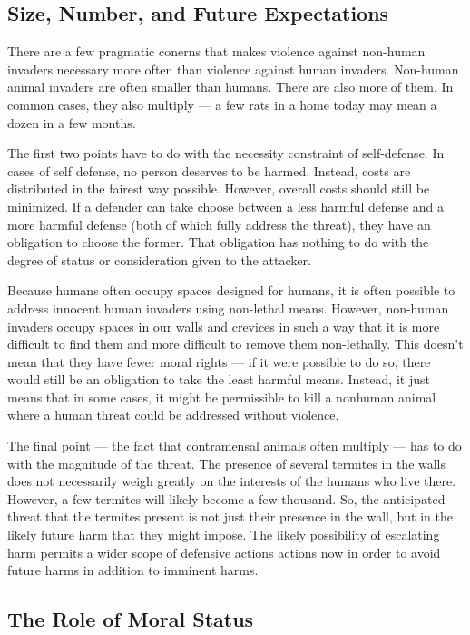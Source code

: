 	\subsection{Size, Number, and Future Expectations}

	There are a few pragmatic conerns that makes violence against non-human
	invaders necessary more often than violence against human invaders.
	Non-human animal invaders are often smaller than humans. There are also more
	of them. In common cases, they also multiply --- a few rats in a home today
	may mean a dozen in a few months.

	The first two points have to do with the necessity constraint of
	self-defense.  In cases of self defense, no person deserves to be harmed.
	Instead, costs are distributed in the fairest way possible. However,
	overall costs should still be minimized. If a defender can take choose
	between a less harmful defense and a more harmful defense (both of which
	fully address the threat), they have an obligation to choose the former.
	That obligation has nothing to do with the degree of status or
	consideration given to the attacker.

	Because humans often occupy spaces designed for humans, it is often
	possible to address innocent human invaders using non-lethal means.
	However, non-human invaders occupy spaces in our walls and crevices in such
	a way that it is more difficult to find them and more difficult to remove
	them non-lethally. This doesn’t mean that they have fewer moral rights ---
	if it were possible to do so, there would still be an obligation to take
	the least harmful means. Instead, it just means that in some cases, it
	might be permissible to kill a nonhuman animal where a human threat could
	be addressed without violence.

	The final point --- the fact that contramensal animals often multiply ---
	has to do with the magnitude of the threat. The presence of several
	termites in the walls does not necessarily weigh greatly on the interests
	of the humans who live there. However, a few termites will likely become a
	few thousand. So, the anticipated threat that the termites present is not
	just their presence in the wall, but in the likely future harm that they
	might impose.  The likely possibility of escalating harm permits a wider
	scope of defensive actions actions now in order to avoid future harms in
	addition to imminent harms.

	\subsection{The Role of Moral Status}

